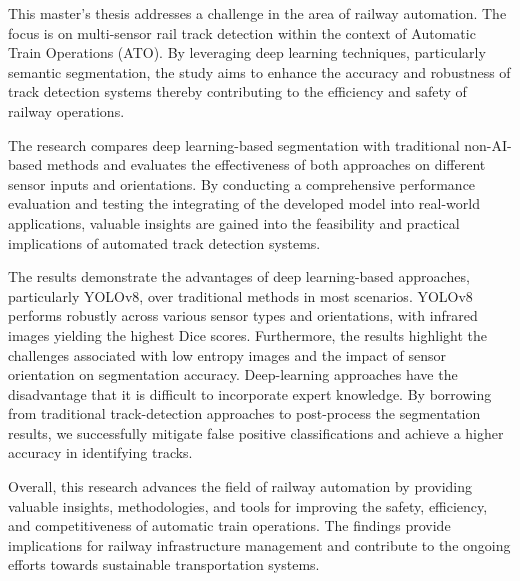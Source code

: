 \documentclass[Master,MDS,english]{BASE/twbook} %
\begin{document}
This master's thesis addresses a challenge in the area of railway automation. The focus is on multi-sensor rail track detection within the context of Automatic Train Operations (ATO). By leveraging deep learning techniques, particularly semantic segmentation, the study aims to enhance the accuracy and robustness of track detection systems thereby contributing to the efficiency and safety of railway operations.

The research compares deep learning-based segmentation with traditional non-AI-based methods and evaluates the effectiveness of both approaches on different sensor inputs and orientations. By conducting a comprehensive performance evaluation and testing the integrating of the developed model into real-world applications, valuable insights are gained into the feasibility and practical implications of automated track detection systems.

The results demonstrate the advantages of deep learning-based approaches, particularly YOLOv8, over traditional methods in most scenarios. YOLOv8 performs robustly across various sensor types and orientations, with infrared images yielding the highest Dice scores. Furthermore, the results highlight the challenges associated with low entropy images and the impact of sensor orientation on segmentation accuracy. 
Deep-learning approaches have the disadvantage that it is difficult to incorporate expert knowledge. By borrowing from traditional track-detection approaches to post-process the segmentation results, we successfully mitigate false positive classifications and achieve a higher accuracy in identifying tracks.

Overall, this research advances the field of railway automation by providing valuable insights, methodologies, and tools for improving the safety, efficiency, and competitiveness of automatic train operations. The findings provide implications for railway infrastructure management and contribute to the ongoing efforts towards sustainable transportation systems.
\end{document}
